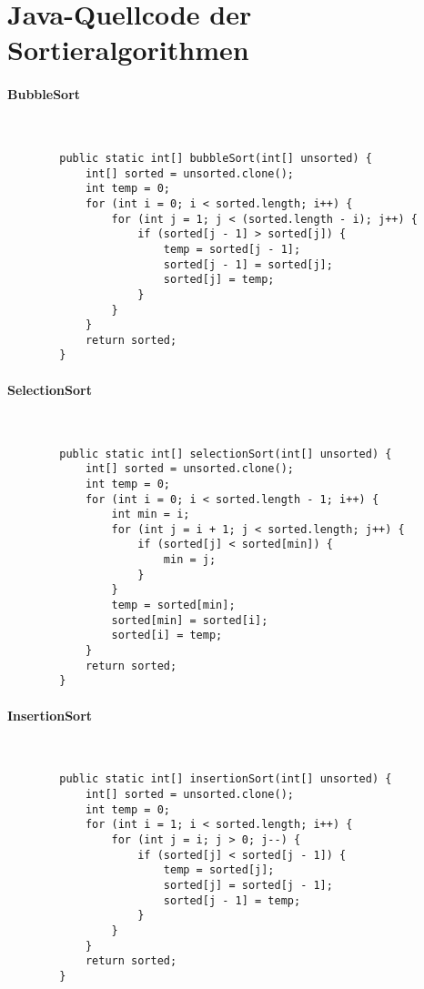 \documentclass[./entry.tex]{subfiles}
\begin{document}
    \section{Java-Quellcode der Sortieralgorithmen}

    \paragraph{BubbleSort} \mbox{}\\
    \begin{lstlisting}
        public static int[] bubbleSort(int[] unsorted) {
            int[] sorted = unsorted.clone();
            int temp = 0;
            for (int i = 0; i < sorted.length; i++) {
                for (int j = 1; j < (sorted.length - i); j++) {
                    if (sorted[j - 1] > sorted[j]) {
                        temp = sorted[j - 1];
                        sorted[j - 1] = sorted[j];
                        sorted[j] = temp;
                    }
                }
            }
            return sorted;
        }
    \end{lstlisting}

    \paragraph{SelectionSort} \mbox{}\\
    \begin{lstlisting}
        public static int[] selectionSort(int[] unsorted) {
            int[] sorted = unsorted.clone();
            int temp = 0;
            for (int i = 0; i < sorted.length - 1; i++) {
                int min = i;
                for (int j = i + 1; j < sorted.length; j++) {
                    if (sorted[j] < sorted[min]) {
                        min = j;
                    }
                }
                temp = sorted[min];
                sorted[min] = sorted[i];
                sorted[i] = temp;
            }
            return sorted;
        }
    \end{lstlisting}

    \paragraph{InsertionSort} \mbox{}\\
    \begin{lstlisting}
        public static int[] insertionSort(int[] unsorted) {
            int[] sorted = unsorted.clone();
            int temp = 0;
            for (int i = 1; i < sorted.length; i++) {
                for (int j = i; j > 0; j--) {
                    if (sorted[j] < sorted[j - 1]) {
                        temp = sorted[j];
                        sorted[j] = sorted[j - 1];
                        sorted[j - 1] = temp;
                    }
                }
            }
            return sorted;
        }
    \end{lstlisting}
\end{document}
